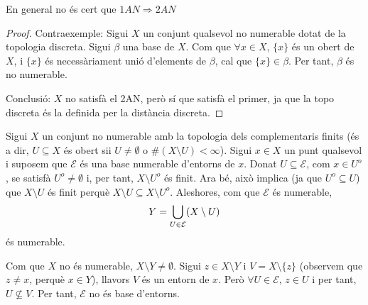 \documentclass[../main.tex]{subfiles}
\begin{document}
\begin{nota}\label{nota:1annoimplica2an}
En general no és cert que $1AN\Rightarrow 2AN$
\end{nota}
\begin{proof}
Contraexemple: Sigui $X$ un conjunt qualsevol no numerable dotat de la topologia discreta. Sigui $\beta$ una base de $X$. Com que $\forall x\in X$, $\{x\}$ és un obert de $X$, i $\{x\}$ és necessàriament unió d'elements de $\beta$, cal que $\{x\}\in\beta$. Per tant, $\beta$ és no numerable.

Conclusió: $X$ no satisfà el 2AN, però sí que satisfà el primer, ja que la topo discreta és la definida per la distància discreta.
\end{proof}

\begin{ej}
Sigui $X$ un conjunt no numerable amb la topologia dels complementaris finits (és a dir, $U\subseteq X$ és obert sii $U\not=\emptyset$ o $\#(X\setminus U)<\infty$). Sigui $x\in X$ un punt qualsevol i suposem que $\mathcal{E}$ és una base numerable d'entorns de $x$. Donat $U\subseteq \mathcal{E}$, com $x\in U^{o}$, se satisfà $U^{o}\not=\emptyset$ i, per tant, $X\setminus U^{o}$ és finit. Ara bé, això implica (ja que $U^{o}\subseteq U$) que $X\setminus U$ és finit perquè $X\setminus U\subseteq X\setminus U^{o}$. Aleshores, com que $\mathcal{E}$ és numerable,
\begin{equation}
    \notag
    Y = \bigcup_{U\in\mathcal{E}}(X\setminus U)
\end{equation}
és numerable.

Com que $X$ no és numerable, $X\setminus Y\not=\emptyset$. Sigui $z\in X\setminus Y$ i $V=X\setminus\{z\}$ (observem que $z\not=x$, perquè $x\in Y$), llavors $V$ és un entorn de $x$. Però $\forall U\in\mathcal{E}$, $z\in U$ i per tant, $U\not\subseteq V$. Per tant, $\mathcal{E}$ no és base d'entorns.
\end{ej}
\end{document}
